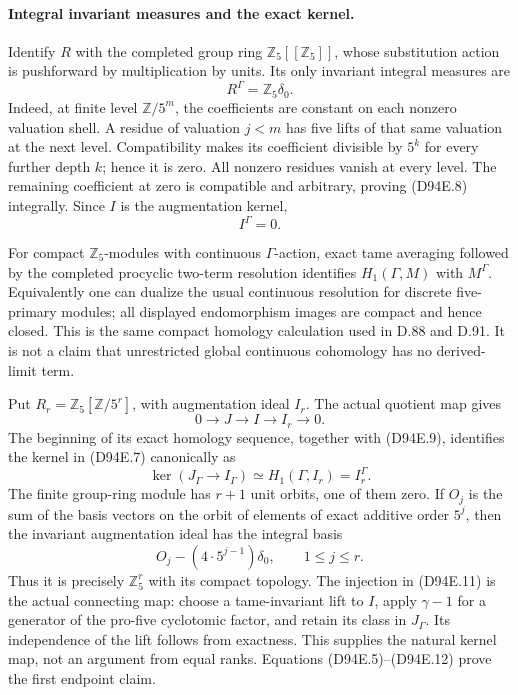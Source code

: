 \paragraph{Integral invariant measures and the exact kernel.}
Identify \(R\) with the completed group ring
\(\mathbb Z_5[[\mathbb Z_5]]\), whose substitution action
is pushforward by multiplication by units. Its only invariant
integral measures are
\[
                              R^\Gamma=\mathbb Z_5\delta_0.
                                                        \tag{D94E.8}
\]
Indeed, at finite level \(\mathbb Z/5^m\), the coefficients
are constant on each nonzero valuation shell. A residue of
valuation \(j<m\) has five lifts of that same valuation at
the next level. Compatibility makes its coefficient divisible
by \(5^k\) for every further depth \(k\); hence it is zero.
All nonzero residues vanish at every level. The remaining
coefficient at zero is compatible and arbitrary, proving
(D94E.8) integrally. Since \(I\) is the augmentation kernel,
\[
                                  I^\Gamma=0.           \tag{D94E.9}
\]

For compact \(\mathbb Z_5\)-modules with continuous
\(\Gamma\)-action, exact tame averaging followed by the
completed procyclic two-term resolution identifies
\(H_1(\Gamma,M)\) with \(M^\Gamma\). Equivalently one
can dualize the usual continuous resolution for discrete
five-primary modules; all displayed endomorphism images
are compact and hence closed. This is the same compact
homology calculation used in D.88 and D.91. It is not a
claim that unrestricted global continuous cohomology has
no derived-limit term.

Put \(R_r=\mathbb Z_5[\mathbb Z/5^r]\), with augmentation
ideal \(I_r\). The actual quotient map gives
\[
            0\longrightarrow J\longrightarrow I
                      \longrightarrow I_r\longrightarrow0.
                                                        \tag{D94E.10}
\]
The beginning of its exact homology sequence, together with
(D94E.9), identifies the kernel in (D94E.7) canonically as
\[
 \ker(J_\Gamma\to I_\Gamma)
        \simeq H_1(\Gamma,I_r)=I_r^\Gamma.
                                                        \tag{D94E.11}
\]
The finite group-ring module has \(r+1\) unit orbits, one
of them zero. If \(O_j\) is the sum of the basis vectors
on the orbit of elements of exact additive order \(5^j\),
then the invariant augmentation ideal has the integral basis
\[
                O_j-(4\cdot5^{j-1})\delta_0,
                         \qquad 1\le j\le r.            \tag{D94E.12}
\]
Thus it is precisely \(\mathbb Z_5^r\) with its compact
topology. The injection in (D94E.11) is the actual connecting
map: choose a tame-invariant lift to \(I\), apply
\(\gamma-1\) for a generator of the pro-five cyclotomic
factor, and retain its class in \(J_\Gamma\). Its
independence of the lift follows from exactness. This supplies
the natural kernel map, not an argument from equal ranks.
Equations (D94E.5)--(D94E.12) prove the first endpoint claim.

